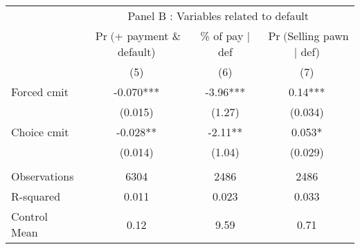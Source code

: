 \begin{tabular}{lccc}
\toprule
      & \multicolumn{3}{c}{Panel B  : Variables related to default} \\
\cmidrule{2-4}      & $\Pr($+ payment \& default) & \% of pay $|$ def  & $\Pr($Selling pawn $|$ def) \\
\midrule
\midrule
      & (5)   & (6)   & (7) \\
\midrule
\midrule
Forced cmit & -0.070*** & -3.96*** & 0.14*** \\
      & (0.015) & (1.27) & (0.034) \\
Choice cmit & -0.028** & -2.11** & 0.053* \\
      & (0.014) & (1.04) & (0.029) \\
      &       &       &  \\
\midrule
Observations & 6304  & 2486  & 2486 \\
R-squared & 0.011 & 0.023 & 0.033 \\
Control Mean & 0.12  & 9.59  & 0.71 \\
\bottomrule
\bottomrule
\end{tabular}%
